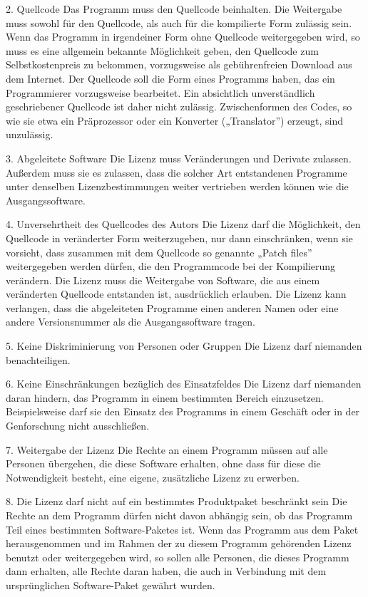 2. Quellcode
Das Programm muss den Quellcode beinhalten. Die Weitergabe muss sowohl für den Quellcode, als auch für die kompilierte Form zulässig sein. Wenn das Programm in irgendeiner Form ohne Quellcode weitergegeben wird, so muss es eine allgemein bekannte Möglichkeit geben, den Quellcode zum Selbstkostenpreis zu bekommen, vorzugsweise als gebührenfreien Download aus dem Internet. Der Quellcode soll die Form eines Programms haben, das ein Programmierer vorzugsweise bearbeitet. Ein absichtlich unverständlich geschriebener Quellcode ist daher nicht zulässig. Zwischenformen des Codes, so wie sie etwa ein Präprozessor oder ein Konverter („Translator”) erzeugt, sind unzulässig.

3. Abgeleitete Software
Die Lizenz muss Veränderungen und Derivate zulassen. Außerdem muss sie es zulassen, dass die solcher Art entstandenen Programme unter denselben Lizenzbestimmungen weiter vertrieben werden können wie die Ausgangssoftware.

4. Unversehrtheit des Quellcodes des Autors
Die Lizenz darf die Möglichkeit, den Quellcode in veränderter Form weiterzugeben, nur dann einschränken, wenn sie vorsieht, dass zusammen mit dem Quellcode so genannte „Patch files” weitergegeben werden dürfen, die den Programmcode bei der Kompilierung verändern. Die Lizenz muss die Weitergabe von Software, die aus einem veränderten Quellcode entstanden ist, ausdrücklich erlauben. Die Lizenz kann verlangen, dass die abgeleiteten Programme einen anderen Namen oder eine andere Versionsnummer als die Ausgangssoftware tragen.

5. Keine Diskriminierung von Personen oder Gruppen
Die Lizenz darf niemanden benachteiligen.

6. Keine Einschränkungen bezüglich des Einsatzfeldes
Die Lizenz darf niemanden daran hindern, das Programm in einem bestimmten Bereich einzusetzen. Beispielsweise darf sie den Einsatz des Programms in einem Geschäft oder in der Genforschung nicht ausschließen.

7. Weitergabe der Lizenz
Die Rechte an einem Programm müssen auf alle Personen übergehen, die diese Software erhalten, ohne dass für diese die Notwendigkeit besteht, eine eigene, zusätzliche Lizenz zu erwerben.

8. Die Lizenz darf nicht auf ein bestimmtes Produktpaket beschränkt sein
Die Rechte an dem Programm dürfen nicht davon abhängig sein, ob das Programm Teil eines bestimmten Software-Paketes ist. Wenn das Programm aus dem Paket herausgenommen und im Rahmen der zu diesem Programm gehörenden Lizenz benutzt oder weitergegeben wird, so sollen alle Personen, die dieses Programm dann erhalten, alle Rechte daran haben, die auch in Verbindung mit dem ursprünglichen Software-Paket gewährt wurden.

